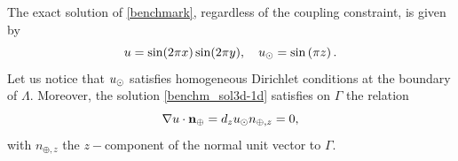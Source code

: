 \documentclass[r]{siamart171218}
\newcommand{\paoloold}[1]{{\color{black}#1}}
\begin{document}
The exact solution of \eqref{benchmark}, regardless of the coupling constraint,
is given by
%
\begin{equation}
\label{benchm_sol3d-1d}
u=\sin (2\pi x) \sin (2\pi y),
\quad
\ud=\sin \left({\pi z}\right).
\end{equation}
%
Let us notice that $u_{\odot}$ satisfies homogeneous Dirichlet conditions at the boundary of $\Lambda$.
Moreover, the solution \eqref{benchm_sol3d-1d} satisfies on $\Gamma$ the relation
\begin{equation}\label{benchm_flux}
\nabla u \cdot \textbf{n}_{\oplus}=d_z \ud n_{\oplus,z}=0,
\end{equation}
with $n_{\oplus,z}$ the $z-$component of the normal unit vector to $\Gamma$.

\end{document}
